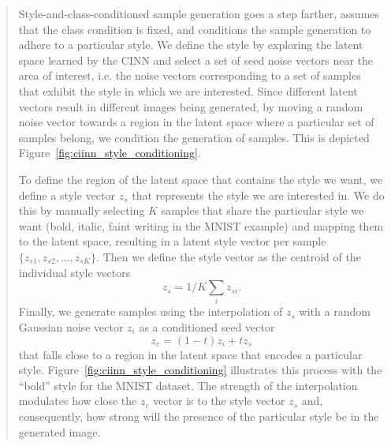 \begin{quote}
Style-and-class-conditioned sample generation goes a step farther, assumes that the class condition is fixed, and conditions the sample generation to adhere to a particular style. We define the style by exploring the latent space learned by the CINN and select a set of seed noise vectors near the area of interest, i.e. the noise vectors corresponding to a set of samples that exhibit the style in which we are interested. Since different latent vectors result in different images being generated, by moving a random noise vector towards a region in the latent space where a particular set of samples belong, we condition the generation of samples. This is depicted Figure~\ref{fig:ciinn_style_conditioning}. 

To define the region of the latent space that contains the style we want, we define a style vector $z_s$ that represents the style we are interested in. We do this by manually selecting $K$ samples that share the particular style we want (bold, italic, faint writing in the MNIST example) and mapping them to the latent space, resulting in a latent style vector per sample $\{z_{s1}, z_{s2}, ..., z_{sK}\}$. Then we define the style vector as the centroid of the individual style vectors 
% 
\begin{equation}
    z_{s} = 1/K \sum_{i} z_{si}.
\end{equation}
% 
Finally, we generate samples using the interpolation of $z_{s}$ with a random Gaussian noise vector $z_i$ as a conditioned seed vector 
% 
\begin{equation}
    z_c = (1-t) z_i + t z_{s} 
\end{equation}
% 
that falls close to a region in the latent space that encodes a particular style. Figure~\ref{fig:ciinn_style_conditioning} illustrates this process with the ``bold'' style for the MNIST dataset. The strength of the interpolation modulates how close the $z_c$ vector is to the style vector $z_s$ and, consequently, how strong will the presence of the particular style be in the generated image.
\end{quote}


